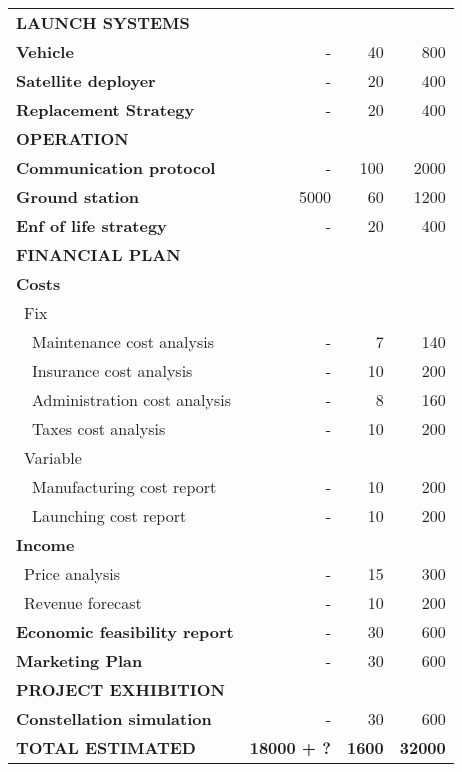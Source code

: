\begin{longtable}{| l | r | r |r | }
\rowcolor[gray]{0.85} \textbf{LAUNCH SYSTEMS} & &  &   \\
	
	\textbf{Vehicle} & - & 40 & 800 \\
	\hline
	\textbf{Satellite deployer} & - & 20 & 400  \\
	\hline
	\textbf{Replacement Strategy} & - & 20 & 400  \\
	
\rowcolor[gray]{0.85} \textbf{OPERATION} & &  &  \\
	
	\textbf{Communication protocol} & - & 100 & 2000 \\
	\hline
	\textbf{Ground station} & 5000 & 60 & 1200 \\
	\hline
	\textbf{Enf of life strategy} & - & 20  & 400 \\
	\hline

\pagebreak

	\hline
\rowcolor[gray]{0.85} \textbf{FINANCIAL PLAN} & &  & \\
	
	\textbf{Costs} & & & \\
	   \blue ~Fix & &  &   \\
	   ~~Maintenance cost analysis & - & 7 & 140 \\
	   ~~Insurance cost analysis & - & 10 & 200 \\
	   ~~Administration cost analysis & - & 8 & 160 \\
	   ~~Taxes cost analysis & - & 10 & 200 \\
	   \blue ~Variable & &  & \\
	   ~~Manufacturing cost report & - & 10 & 200 \\
	   ~~Launching cost report & - & 10 & 200 \\
	\hline
	\textbf{Income} & & &  \\
	   \blue ~Price analysis & - & 15  & 300  \\
	   \blue ~Revenue forecast & - & 10  & 200  \\
	\hline
	\textbf{Economic feasibility report} & - & 30 & 600 \\
	\hline
	\textbf{Marketing Plan} & - & 30 & 600 \\
\rowcolor[gray]{0.85} \textbf{PROJECT EXHIBITION} & & &  \\

	\textbf{Constellation simulation} & - & 30 & 600 \\

\rowcolor[gray]{0.65} \textbf{TOTAL ESTIMATED} & \textbf{18000 + ?} & \textbf{1600} & \textbf{32000} \\
    \hline

\end{longtable}